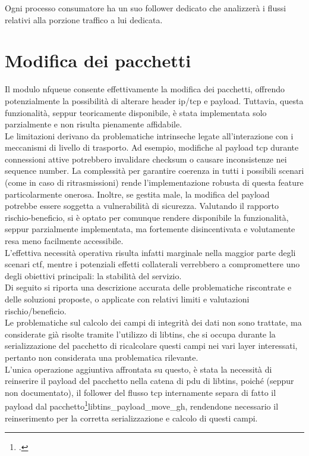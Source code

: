 Ogni processo consumatore ha un suo follower dedicato che analizzerà i flussi relativi alla porzione traffico a lui dedicata.

\section{Modifica dei pacchetti}

Il modulo \gls{nfqueue} consente effettivamente la modifica dei pacchetti, offrendo potenzialmente la possibilità di alterare header
\gls{ip}/\gls{tcp} e payload. Tuttavia, questa funzionalità, seppur teoricamente disponibile, è stata implementata solo parzialmente e non risulta pienamente affidabile.\\
Le limitazioni derivano da problematiche intrinseche legate all’interazione con i meccanismi di livello di trasporto. Ad esempio, modifiche al payload \gls{tcp} durante connessioni attive potrebbero invalidare checksum o causare inconsistenze nei \gls{seq}uence number. La complessità per garantire coerenza in tutti i possibili scenari (come in caso di ritrasmissioni) rende l’implementazione robusta di questa feature particolarmente onerosa. Inoltre, se gestita male, la modifica del payload potrebbe essere soggetta a vulnerabilità di sicurezza. Valutando il rapporto rischio-beneficio, si è optato per comunque rendere disponibile la funzionalità, seppur parzialmente implementata, ma fortemente disincentivata e volutamente resa meno facilmente accessibile.\\
L’effettiva necessità operativa risulta infatti marginale nella maggior parte degli scenari \gls{ctf}, mentre i potenziali effetti collaterali verrebbero a compromettere uno degli obiettivi principali: la stabilità del servizio.\\
Di seguito si riporta una descrizione accurata delle problematiche riscontrate e delle soluzioni proposte, o applicate con relativi limiti e valutazioni rischio/beneficio.\\

Le problematiche sul calcolo dei campi di integrità dei dati non sono trattate, ma considerate già risolte tramite l'utilizzo di libtins, che si occupa durante la serializzazione del pacchetto di ricalcolare questi campi nei vari layer interessati, pertanto non considerata una problematica rilevante.\\
L'unica operazione aggiuntiva affrontata su questo, è stata la necessità di reinserire il payload del pacchetto nella catena di \gls{pdu} di libtins, poiché (seppur non documentato), il follower del flusso \gls{tcp} internamente separa di fatto il payload dal pacchetto\footcite{Libtins, istruzione per la separazione del payload nel follower (std::move del payload)}{libtins_payload_move_gh}, rendendone necessario il reinserimento per la corretta serializzazione e calcolo di questi campi.\\

